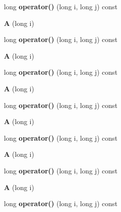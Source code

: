 \begin{DoxyCompactItemize}
long {\bfseries operator()} (long i, long j) const
\item 
\mbox{\label{struct_a_a770cd2af7b6878f9d1ab52ed28536341}} 
{\bfseries A} (long i)
\item 
\mbox{\label{struct_a_a82a55c3fc46f9cbb74868e6794d9ddf0}} 
long {\bfseries operator()} (long i, long j) const
\item 
\mbox{\label{struct_a_a770cd2af7b6878f9d1ab52ed28536341}} 
{\bfseries A} (long i)
\item 
\mbox{\label{struct_a_a82a55c3fc46f9cbb74868e6794d9ddf0}} 
long {\bfseries operator()} (long i, long j) const
\item 
\mbox{\label{struct_a_a770cd2af7b6878f9d1ab52ed28536341}} 
{\bfseries A} (long i)
\item 
\mbox{\label{struct_a_a82a55c3fc46f9cbb74868e6794d9ddf0}} 
long {\bfseries operator()} (long i, long j) const
\item 
\mbox{\label{struct_a_a770cd2af7b6878f9d1ab52ed28536341}} 
{\bfseries A} (long i)
\item 
\mbox{\label{struct_a_a82a55c3fc46f9cbb74868e6794d9ddf0}} 
long {\bfseries operator()} (long i, long j) const
\item 
\mbox{\label{struct_a_a770cd2af7b6878f9d1ab52ed28536341}} 
{\bfseries A} (long i)
\item 
\mbox{\label{struct_a_a82a55c3fc46f9cbb74868e6794d9ddf0}} 
long {\bfseries operator()} (long i, long j) const
\item 
\mbox{\label{struct_a_a770cd2af7b6878f9d1ab52ed28536341}} 
{\bfseries A} (long i)
\item 
\mbox{\label{struct_a_a82a55c3fc46f9cbb74868e6794d9ddf0}} 
long {\bfseries operator()} (long i, long j) const
\item 
\mbox{\label{struct_a_a770cd2af7b6878f9d1ab52ed28536341}} 

\end{DoxyCompactItemize}
